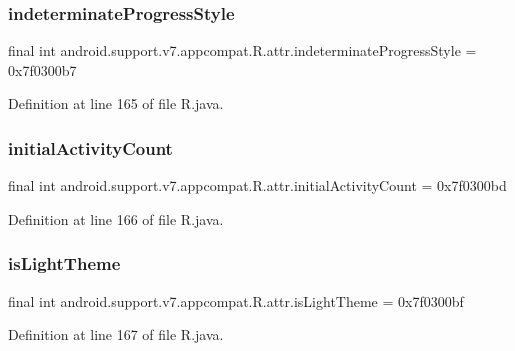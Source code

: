 \subsubsection{\texorpdfstring{indeterminateProgressStyle}{indeterminateProgressStyle}}
{\footnotesize\ttfamily final int android.\+support.\+v7.\+appcompat.\+R.\+attr.\+indeterminate\+Progress\+Style = 0x7f0300b7\hspace{0.3cm}{\ttfamily [static]}}



Definition at line 165 of file R.\+java.

\mbox{\label{classandroid_1_1support_1_1v7_1_1appcompat_1_1_r_1_1attr_af7e4f93600e0713be671334dc7ec8676}} 
\subsubsection{\texorpdfstring{initialActivityCount}{initialActivityCount}}
{\footnotesize\ttfamily final int android.\+support.\+v7.\+appcompat.\+R.\+attr.\+initial\+Activity\+Count = 0x7f0300bd\hspace{0.3cm}{\ttfamily [static]}}



Definition at line 166 of file R.\+java.

\mbox{\label{classandroid_1_1support_1_1v7_1_1appcompat_1_1_r_1_1attr_a7977bfc92e0cda3d33e12833fd72db80}} 
\subsubsection{\texorpdfstring{isLightTheme}{isLightTheme}}
{\footnotesize\ttfamily final int android.\+support.\+v7.\+appcompat.\+R.\+attr.\+is\+Light\+Theme = 0x7f0300bf\hspace{0.3cm}{\ttfamily [static]}}



Definition at line 167 of file R.\+java.

